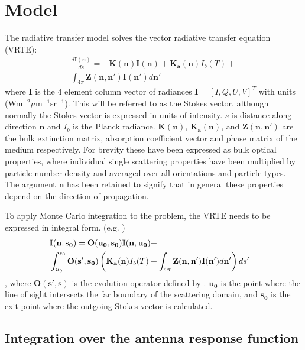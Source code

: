 \section{Model}
 \label{sec:montecarlo:model}
The radiative transfer model solves the vector
radiative transfer equation (VRTE):
\begin{eqnarray}
\frac{d\mathbf{I(n)}}{ds}=-\mathbf{K(n)I(n)} +
\mathbf{K_a(n)}I_b(T) +\nonumber\\
\int_{4\pi}\mathbf{Z(n,n')I(n')}d\mathbf{n'}
\label{vrte}
\end{eqnarray}
where $\mathbf{I}$ is the 4 element column vector of radiances
$\mathbf{I}=\left[I,Q,U,V\right]^T$ with units
(Wm$^{-2}\mu$m$^{-1}$sr$^{-1}$). This will be referred to as the
Stokes vector, although normally the Stokes vector is expressed in
units of intensity.  $s$ is distance along direction $\mathbf{n}$ and
$I_b$ is the Planck radiance. $\mathbf{K(n)}$, $\mathbf{K_a(n)}$,
and $\mathbf{Z(n,n')}$ are the bulk extinction matrix, absorption
coefficient vector and phase matrix of the medium respectively.  For
 brevity these have been expressed as bulk optical
properties, where individual single scattering properties have been
multiplied by particle number density and averaged over all
orientations and particle types. The argument $\mathbf{n}$ has been
retained to signify that in general these properties depend on the
direction of propagation. 

To apply Monte Carlo integration to the problem, the VRTE needs to be expressed in integral form. (e.g. \cite{hochstadt:64})
\begin{eqnarray}
\lefteqn{\mathbf{I(n,s_0)}=\mathbf{O(u_0,s_0)I(n,u_0)}+}\nonumber\\
& \int_{u_0}^{s_0}\mathbf{O(s',s_0)}\left(\mathbf{K_a(n)}I_b(T) +\int_{4\pi}\mathbf{Z(n,n')}\mathbf{I(n')}d\mathbf{n'}\right)ds'\nonumber
\end{eqnarray}
\begin{equation}
\label{intVRTE}
\end{equation}
, where $\mathbf{O(s',s)}$ is the evolution operator defined by
\cite{landi:85}. $\mathbf{u_0}$ is the point where the line of sight intersects
the far boundary of the scattering domain, and $\mathbf{s_0}$ is the
exit point where the outgoing Stokes vector is calculated.

\subsection{Integration over the antenna response function}

